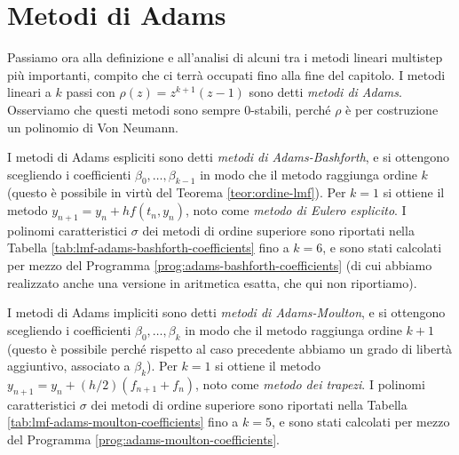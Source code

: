 





\clearpage





\section{Metodi di Adams}

Passiamo ora alla definizione e all'analisi di alcuni tra i metodi lineari
multistep più importanti, compito che ci terrà occupati fino alla fine del capitolo.
I metodi lineari a $k$ passi con $\rho(z) = z^{k+1} (z-1)$ sono detti
\emph{metodi di Adams}. Osserviamo che questi metodi sono sempre 0-stabili,
perché $\rho$ è per costruzione un polinomio di Von Neumann.

I metodi di Adams espliciti sono detti \emph{metodi di Adams-Bashforth},
e si ottengono scegliendo i coefficienti $\beta_0,\dots,\beta_{k-1}$
in modo che il metodo raggiunga ordine $k$ (questo è possibile in virtù
del Teorema \ref{teor:ordine-lmf}). Per $k=1$ si ottiene il metodo
$y_{n+1} = y_n + h f(t_n,y_n)$, noto come \emph{metodo di Eulero esplicito}.
I polinomi caratteristici $\sigma$ dei metodi di ordine superiore sono riportati
nella Tabella \ref{tab:lmf-adams-bashforth-coefficients} fino a $k = 6$,
e sono stati calcolati per mezzo del Programma \ref{prog:adams-bashforth-coefficients}
(di cui abbiamo realizzato anche una versione in aritmetica esatta, che qui non riportiamo).

I metodi di Adams impliciti sono detti \emph{metodi di Adams-Moulton}, e si
ottengono scegliendo i coefficienti $\beta_0,\dots,\beta_k$ in modo che
il metodo raggiunga ordine $k+1$ (questo è possibile perché rispetto al
caso precedente abbiamo un grado di libertà aggiuntivo, associato a $\beta_k$).
Per $k=1$ si ottiene il metodo $y_{n+1} = y_n + (h/2) (f_{n+1}+f_n)$,
noto come \emph{metodo dei trapezi}.
I polinomi caratteristici $\sigma$ dei metodi di ordine superiore sono riportati
nella Tabella \ref{tab:lmf-adams-moulton-coefficients} fino a $k = 5$,
e sono stati calcolati per mezzo del Programma \ref{prog:adams-moulton-coefficients}.

